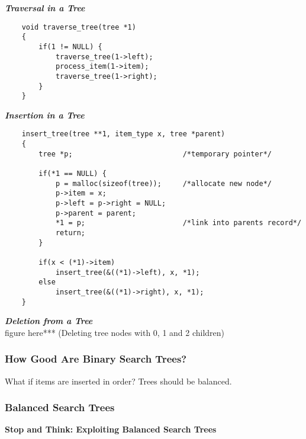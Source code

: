 \textbf{ \emph{Traversal in a Tree} }\\

\begin{verbatim}
    void traverse_tree(tree *1)
    {
        if(1 != NULL) {
            traverse_tree(1->left);
            process_item(1->item);
            traverse_tree(1->right);
        }
    }
\end{verbatim}

\textbf{ \emph{Insertion in a Tree} }\\

\begin{verbatim}
    insert_tree(tree **1, item_type x, tree *parent)
    {
        tree *p;                          /*temporary pointer*/

        if(*1 == NULL) {
            p = malloc(sizeof(tree));     /*allocate new node*/
            p->item = x;
            p->left = p->right = NULL;
            p->parent = parent;
            *1 = p;                       /*link into parents record*/
            return;
        }

        if(x < (*1)->item)
            insert_tree(&((*1)->left), x, *1);
        else
            insert_tree(&((*1)->right), x, *1);
    }
\end{verbatim}

\textbf{ \emph{Deletion from a Tree} }\\

figure here*** (Deleting tree nodes with 0, 1 and 2 children)\\

\subsubsection{How Good Are Binary Search Trees?}

What if items are inserted in order? Trees should be balanced. \\


\subsubsection{Balanced Search Trees}

\noindent{}

\textbf{Stop and Think: Exploiting Balanced Search Trees} \\

